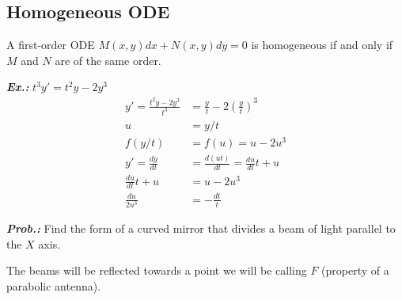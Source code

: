 \documentclass[a4paper]{article}
\begin{document}
\subsection{Homogeneous ODE}

\vspace{1ex}\vspace{1ex}

A first-order ODE $M(x,y)dx+N(x,y)dy=0$ is homogeneous if and only if $M$ and $N$ are of the same order.

\vspace{1ex}\vspace{1ex}

\vspace{2ex}\textit{\textbf{Ex.:}} $t^{3}y'=t^{2}y-2y^{3}$
\begin{align} 
y'=\frac{t^{2}y-2y^{3}}{t^{3}}&=\frac{y}{t}-2\left( \frac{y}{t} \right)^{3} \\
u&=y / t \\
f(y / t)&=f(u)=u-2u^{3} \\
y'=\frac{dy}{dt}&=\frac{d(ut)}{dt}=\frac{du}{dt}t+u \\
\frac{du}{dt}t+u&=u-2u^{3} \\
\frac{du}{2u^{3}}&=-\frac{dt}{t}
\end{align}

\vspace{2ex}\textit{\textbf{Prob.:}} Find the form of a curved mirror that divides a beam of light parallel to the $X$ axis.

The beams will be reflected towards a point we will be calling $F$ (property of a parabolic antenna).
\end{document}
